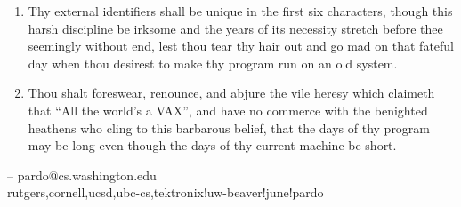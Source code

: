 \begin{enumerate}
\item Thy external identifiers shall be unique in the first six characters,
though this harsh discipline be irksome and the years of its necessity stretch
before thee seemingly without end, lest thou tear thy hair out and go mad on
that fateful day when thou desirest to make thy program run on an old system. 

\item Thou shalt foreswear, renounce, and abjure the vile heresy which claimeth
that ``All the  world's a VAX'', and have no commerce with the benighted
heathens who cling to this  barbarous belief, that the days of thy program may
be long even though the days of thy current machine be short. 
\end{enumerate}

--  
pardo@cs.washington.edu \\
{rutgers,cornell,ucsd,ubc-cs,tektronix}!uw-beaver!june!pardo 



